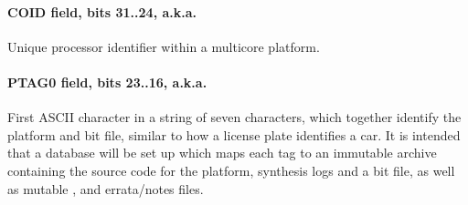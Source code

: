 \paragraph*{COID field, bits 31..24, a.k.a. }
\label{reg:COID}
Unique processor identifier within a multicore platform.
\paragraph*{PTAG0 field, bits 23..16, a.k.a. }
\label{reg:PTAG}
First ASCII character in a string of seven characters, which together identify
the platform and bit file, similar to how a license plate identifies a car. It
is intended that a database will be set up which maps each tag to an immutable
archive containing the source code for the platform, synthesis logs and a bit
file, as well as mutable ,  and errata/notes
files.
